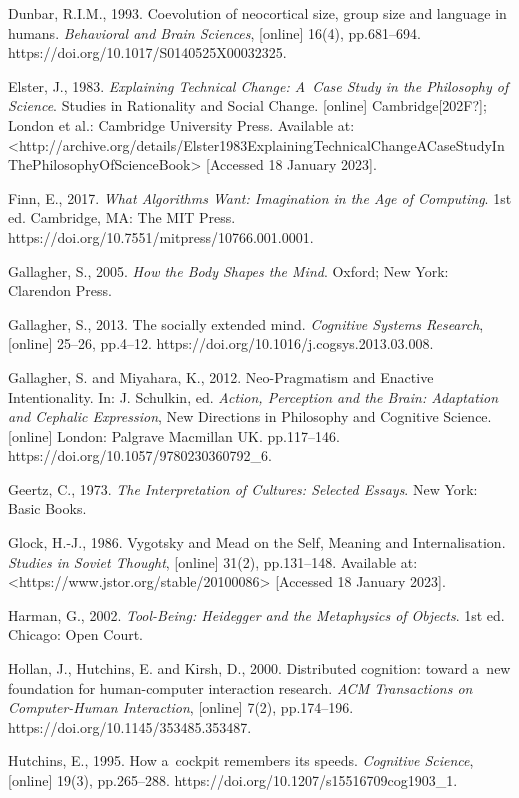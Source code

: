 Dunbar, R.I.M., 1993. Coevolution of neocortical size, group size and language in humans. \textit{Behavioral and Brain Sciences}, [online] 16(4), pp.681–694. https://doi.org/10.1017/S0140525X00032325.

Elster, J., 1983. \textit{Explaining Technical Change: A~Case Study in the Philosophy of Science}. Studies in Rationality and Social Change. [online] Cambridge[202F?]; London et al.: Cambridge University Press. Available at: {\textless}http://archive.org/details/Elster1983ExplainingTechnicalChangeACaseStudyInThePhilosophyOfScienceBook{\textgreater} [Accessed 18 January 2023].

Finn, E., 2017. \textit{What Algorithms Want: Imagination in the Age of Computing}. 1st ed. Cambridge, MA: The MIT Press. https://doi.org/10.7551/mitpress/10766.001.0001.

Gallagher, S., 2005. \textit{How the Body Shapes the Mind}. Oxford; New York: Clarendon Press.

Gallagher, S., 2013. The socially extended mind. \textit{Cognitive Systems Research}, [online] 25–26, pp.4–12. https://doi.org/10.1016/j.cogsys.2013.03.008.

Gallagher, S. and Miyahara, K., 2012. Neo-Pragmatism and Enactive Intentionality. In: J. Schulkin, ed. \textit{Action, Perception and the Brain: Adaptation and Cephalic Expression}, New Directions in Philosophy and Cognitive Science. [online] London: Palgrave Macmillan UK. pp.117–146. https://doi.org/10.1057/9780230360792\_6.

Geertz, C., 1973. \textit{The Interpretation of Cultures: Selected Essays}. New York: Basic Books.

Glock, H.-J., 1986. Vygotsky and Mead on the Self, Meaning and Internalisation. \textit{Studies in Soviet Thought}, [online] 31(2), pp.131–148. Available at: {\textless}https://www.jstor.org/stable/20100086{\textgreater} [Accessed 18 January 2023].

Harman, G., 2002. \textit{Tool-Being: Heidegger and the Metaphysics of Objects}. 1st ed. Chicago: Open Court.

Hollan, J., Hutchins, E. and Kirsh, D., 2000. Distributed cognition: toward a~new foundation for human-computer interaction research. \textit{ACM Transactions on Computer-Human Interaction}, [online] 7(2), pp.174–196. https://doi.org/10.1145/353485.353487.

Hutchins, E., 1995. How a~cockpit remembers its speeds. \textit{Cognitive Science}, [online] 19(3), pp.265–288. https://doi.org/10.1207/s15516709cog1903\_1.

